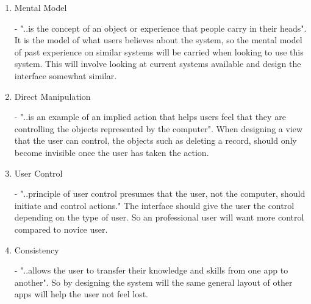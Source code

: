 \begin{enumerate}
  \item Mental Model 
  
  - "..is the concept of an object or experience that people carry in their heads". It is the model of what users believes about the system, so the mental model of past experience on similar systems will be carried when looking to use this system. This will involve looking at current systems available and design the interface somewhat similar.
  
  \item Direct Manipulation
  
  - "..is an example of an implied action that helps users feel that they are controlling the objects represented by the computer". When designing a view that the user can control, the objects such as deleting a record, should only become invisible once the user has taken the action.
  
  \item User Control 
  
  - "..principle of user control presumes that the user, not the computer, should initiate and control actions." The interface should give the user the control depending on the type of user. So an professional user will want more control compared to novice user.
  
  \item Consistency
  
  - "..allows the user to transfer their knowledge and skills from one app to another". So by designing the system will the same general layout of other apps will help the user not feel lost.
  
\end{enumerate}